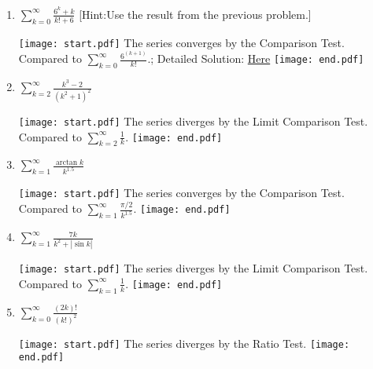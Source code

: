 \documentclass[12pt]{article}
\begin{document}
\begin{enumerate}
\item $\sum_{k=0}^{\infty}{\frac{6^k+k}{k!+6 }}$ [Hint:Use the result from the previous problem.]

\texttt{[image: start.pdf]}
{{The series converges by the Comparison Test.  Compared to $\sum_{k=0}^{\infty}{\frac{6^{(k+1)}}{k! }}$.; Detailed Solution: \textcolor{blue}{\href{http://www.math.drexel.edu/classes/Calculus/resources/Math123HW/Solutions/123_09_Comparison_Ratio_Root_Tests_18.pdf}{Here}}}}
\texttt{[image: end.pdf]}


\item $\sum_{k=2}^{\infty}{\frac{k^3-2}{\left(k^2+1\right)^2 }}$

\texttt{[image: start.pdf]}
{{The series diverges by the Limit Comparison Test.  Compared to $\sum_{k=2}^{\infty}{\frac{1}{k}}$.}}
\texttt{[image: end.pdf]}


\item $\sum_{k=1}^{\infty}{\frac{\arctan{k}}{k^{1.5} }}$

\texttt{[image: start.pdf]}
{{The series converges by the Comparison Test.  Compared to $\sum_{k=1}^{\infty}{\frac{\pi/2}{k^{1.5}}   }$.}}
\texttt{[image: end.pdf]}


\item $\sum_{k=1}^{\infty}{\frac{7k}{k^2+|\sin{k}| }}$

\texttt{[image: start.pdf]}
{{The series diverges by the Limit Comparison Test.  Compared to $\sum_{k=1}^{\infty}{\frac{1}{k}}$.}}
\texttt{[image: end.pdf]}


\item $\sum_{k=0}^{\infty}{\frac{(2k)!}{(k!)^2 }}$

\texttt{[image: start.pdf]}
{{The series diverges by the Ratio Test.}}
\texttt{[image: end.pdf]}


\end{enumerate}
\end{document}
